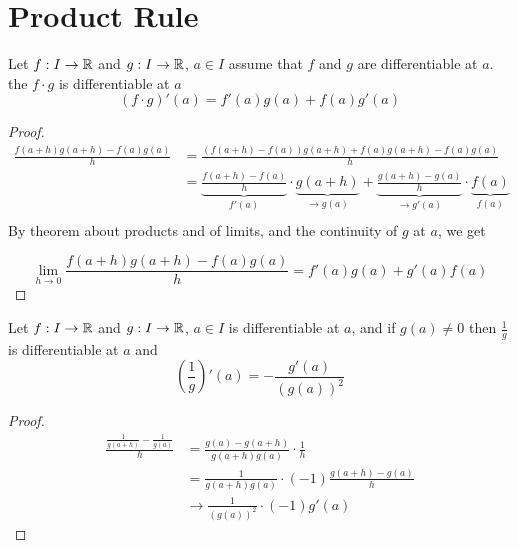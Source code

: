 \section{Product Rule}

\begin{theorem*}
  Let $f: I \to \mathbb R$ and $g: I \to \mathbb R$, $a\in I$ assume that $f$ and $g$ are differentiable at $a$. 
  the $f\cdot g$ is differentiable at $a$
  $$(f\cdot g)'(a) = f'(a)g(a) + f(a)g'(a)$$
\end{theorem*}
\begin{proof}
  \begin{align*}
    \frac{f(a + h)g(a + h) - f(a)g(a)}{h} &= \frac{(f(a+h) - f(a))g(a+h) + f(a)g(a+h) - f(a)g(a)}{h} \\
    &= \underbrace{\frac{f(a+h) - f(a)}{h}}_{f'(a)}\cdot \underbrace{g(a+h)}_{\to g(a)} + \underbrace{\frac{g(a + h) - g(a)}{h}}_{\to g'(a)} \cdot \underbrace{f(a)}_{f(a)} \\
  \end{align*}
  By theorem about products and of limits, and the continuity of $g$ at $a$, we get

  $$\lim\limits_{h \to 0} \frac{f(a+h)g(a+h) - f(a)g(a)}{h} = f'(a)g(a) + g'(a)f(a)$$
\end{proof}


\begin{theorem*}
  Let $f: I \to \mathbb R$ and $g: I \to \mathbb R$, $a\in I$ is differentiable at $a$, and if $g(a) \neq 0$
  then $\frac{1}{g}$ is differentiable at $a$ and $$\left(\frac{1}{g}\right)'(a) = -\frac{g'(a)}{(g(a))^2}$$
\end{theorem*}
\begin{proof}
  \begin{align*}
    \frac{\frac{1}{g(a+h)} - \frac{1}{g(a)}}{h} &= \frac{g(a) - g(a + h)}{g(a+h)g(a)}\cdot\frac{1}{h} \\
    &= \frac{1}{g(a+h)g(a)}\cdot (-1)\frac{g(a+h) - g(a)}{h} \\
    &\to \frac{1}{(g(a))^2}\cdot (-1) g'(a) 
  \end{align*}
\end{proof}



